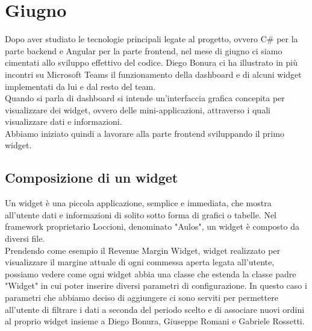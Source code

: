 \chapter{Giugno}
\label{chap:giugno}

Dopo aver studiato le tecnologie principali legate al progetto, ovvero C\# per la parte backend e Angular per la parte frontend, nel mese di giugno ci siamo cimentati allo sviluppo effettivo del codice.
Diego Bonura ci ha illustrato in più incontri su Microsoft Teams il funzionamento della dashboard e di alcuni widget implementati da lui e dal resto del team. \\ Quando si parla di dashboard si intende 
un'interfaccia grafica concepita per visualizzare dei widget, ovvero delle mini-applicazioni, attraverso i quali visualizzare dati e informazioni.
\\ Abbiamo iniziato quindi a lavorare alla parte frontend sviluppando il primo widget.

\section{Composizione di un widget}
Un widget è una piccola applicazione, semplice e immediata, che mostra all'utente dati e informazioni di solito sotto forma di grafici o tabelle. Nel framework proprietario Loccioni, denominato "Aulos", un widget è composto da diversi file. \\ Prendendo come esempio il Revenue Margin Widget, widget realizzato per visualizzare il margine attuale di ogni commessa aperta legata all'utente, possiamo vedere come ogni widget abbia una classe che estenda la classe padre "Widget" in cui poter inserire diversi parametri di configurazione. In questo caso i parametri che abbiamo deciso di aggiungere ci sono serviti per permettere all'utente di filtrare i dati a seconda del periodo scelto e di associare nuovi ordini al proprio widget insieme a Diego Bonura, Giuseppe Romani e Gabriele Rossetti.
\\

